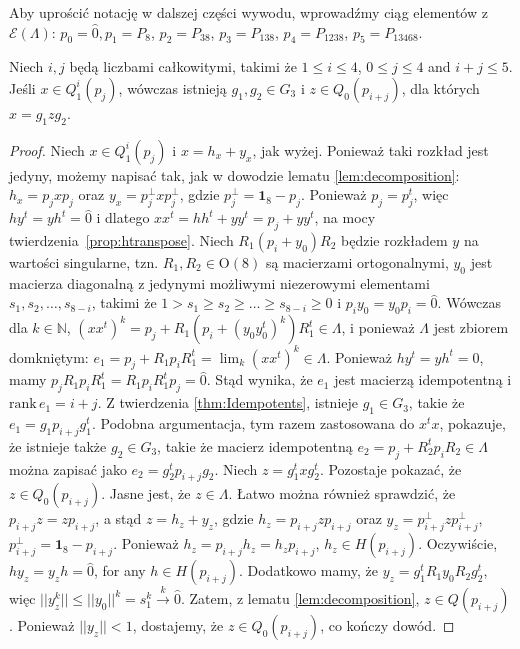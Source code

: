 Aby uprościć notację w dalszej części wywodu,
wprowadźmy ciąg elementów z $\mathcal{E}(\Lambda)$:
$p_{0} = \hat{0}, p_{1} = P_{8}$, $p_{2} = P_{38}$,
$p_{3} = P_{138}$, $p_{4} = P_{1238}$, $p_{5} = P_{13468}$.
\begin{Theorem}
\label{thm:LowerIndices}
    Niech $i,j$ będą liczbami całkowitymi, takimi że
    $1 \leq i \leq 4$, $0 \leq j \leq 4$ and $i+j \leq 5$.
Jeśli $x \in Q_{1}^{i}(p_{j})$,
wówczas istnieją $g_{1}, g_{2} \in G_{3}$ i $z \in Q_{0}(p_{i+j})$,
dla których $x = g_{1} z g_{2}$.
\end{Theorem}
\begin{proof}
    Niech $x \in Q_{1}^{i}(p_{j})$ i
    $x = h_{x} + y_{x}$, jak wyżej.
    Ponieważ taki rozkład jest jedyny, możemy napisać tak, jak w dowodzie
    lematu \ref{lem:decomposition}:
    $h_{x} = p_{j} x p_{j}$ oraz $y_{x} = p_{j}^{\perp} x p_{j}^{\perp}$,
    gdzie $p_{j}^{\perp} = \mathbf{1}_{8} - p_{j}$.
    Ponieważ $p_{j} = p_{j}^{t}$, więc
    $h y^{t} = y h^{t} = \hat{0}$ i dlatego
    $x x^{t}  = h h^{t} + y y^{t} = p_{j} + y y^{t}$,
    na mocy \mbox{twierdzenia \ref{prop:htranspose}}.
    Niech $R_{1} (p_{i} + y_{0}) R_{2}$ będzie rozkładem $y$ na wartości
    singularne, tzn. $R_{1}, R_{2} \in \text{O}(8)$ są macierzami ortogonalnymi,
    $y_{0}$ jest macierza diagonalną z jedynymi możliwymi niezerowymi elementami
    $s_{1}, s_{2}, \ldots, s_{8-i}$, takimi że
    $1 > s_{1} \geq s_{2} \geq \ldots \geq s_{8-i} \geq 0$
    i $p_{i} y_{0} = y_{0} p_{i} = \hat{0}$.
    Wówczas dla $k \in \mathbb{N}$,
    $(x x^{t})^{k} = p_{j} + R_{1}( p_{i} + (y_{0} y_{0}^{t})^{k}) R_{1}^{t} \in \Lambda$,
    i ponieważ $\Lambda$ jest zbiorem domkniętym:
    $e_{1} = p_{j} + R_{1} p_{i} R_{1}^{t} = \lim_{k} (x x^{t})^{k} \in \Lambda$.
    Ponieważ $h y^{t} = y h^{t} = \hat{0}$,
    mamy $p_{j} R_{1} p_{i} R_{1}^{t} = R_{1} p_{i} R_{1}^{t} p_{j} = \hat{0}$.
    Stąd wynika, że $e_{1}$ jest macierzą idempotentną i
    $\text{rank} \, e_{1} = i+j$.
    Z twierdzenia \ref{thm:Idempotents}, istnieje $g_{1} \in G_{3}$, takie że
    $e_{1} = g_{1} p_{i+j} g_{1}^{t}$.
    Podobna argumentacja,
    tym razem zastosowana do $x^{t} x$, pokazuje,
    że istnieje także $g_{2} \in G_{3}$,
    takie że macierz idempotentną
    $e_{2} = p_{j} + R_{2}^{t} p_{i} R_{2} \in \Lambda$
    można zapisać jako $e_{2} = g_{2}^{t} p_{i+j} g_{2}$.
    Niech $z = g_{1}^{t} x g_{2}^{t}$.
    Pozostaje pokazać, że $z \in Q_{0}(p_{i+j})$.
    Jasne jest, że $z \in \Lambda$.
    Łatwo można również sprawdzić, że $p_{i+j} z = z p_{i+j}$,
    a stąd $z = h_{z} + y_{z}$, gdzie $h_{z} = p_{i+j} z p_{i+j}$
    oraz $y_{z} = p_{i+j}^{\perp} z p_{i+j}^{\perp}$,
    $p_{i+j}^{\perp} = \mathbf{1}_{8} - p_{i+j}$.
    Ponieważ $h_{z} = p_{i+j} h_{z} = h_{z} p_{i+j}$,
    $h_{z} \in H(p_{i+j})$.
    Oczywiście, $h y_{z} = y_{z} h = \hat{0}$, for any $h \in H(p_{i+j})$.
    Dodatkowo mamy, że
    $y_{z} = g_{1}^{t}R_{1} y_{0} R_{2} g_{2}^{t}$, więc
    $||y_{z}^{k}|| \leq ||y_{0}||^{k} = s_{1}^{k} \overset{k}{\rightarrow} \hat{0}$.
    Zatem, z lematu \ref{lem:decomposition}, $z \in Q(p_{i+j})$.
    Ponieważ $||y_{z}|| < 1$, dostajemy, że
    $z \in Q_{0}(p_{i+j})$, co kończy dowód.
\end{proof}

